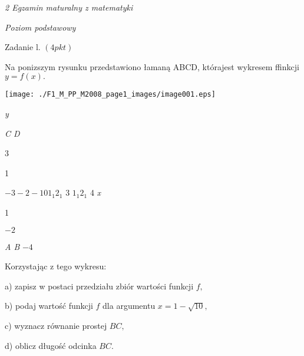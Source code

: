 \documentclass[a4paper,12pt]{article}
\begin{document}
{\it 2 Egzamin maturalny z matematyki}

{\it Poziom podstawowy}

Zadanie l. $(4pkt)$

Na ponizszym rysunku przedstawiono łamaną ABCD, którajest wykresem ffinkcji $y=f(x).$
\begin{center}
\texttt{[image: ./F1\_M\_PP\_M2008\_page1\_images/image001.eps]}
\end{center}
{\it y}

{\it C  D}

3

1

$-3 -2  -1  0 1_{1} 2_{1}$ 3  $1_{1} 2_{1}$  4  {\it x}

1

$-2$

{\it A  B}  $-4$

Korzystając z tego wykresu:

a) zapisz w postaci przedziału zbiór wartości funkcji $f,$

b) podaj wartość funkcji $f$ dla argumentu $x=1-\sqrt{10},$

c) wyznacz równanie prostej $BC,$

d) oblicz długość odcinka $BC.$
\end{document}
